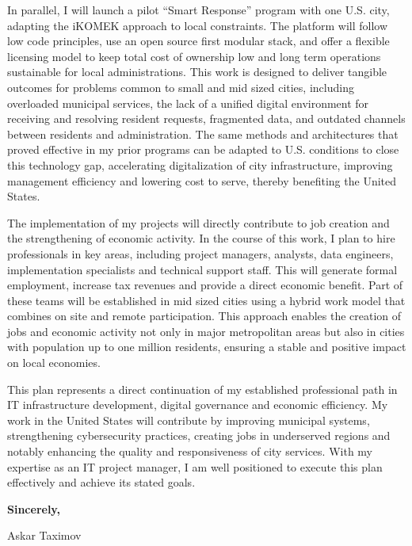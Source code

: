 In parallel, I will launch a pilot “Smart Response” program with one U.S. city, adapting the iKOMEK approach to local constraints. The platform will follow low code principles, use an open source first modular stack, and offer a flexible licensing model to keep total cost of ownership low and long term operations sustainable for local administrations. This work is designed to deliver tangible outcomes for problems common to small and mid sized cities, including overloaded municipal services, the lack of a unified digital environment for receiving and resolving resident requests, fragmented data, and outdated channels between residents and administration. The same methods and architectures that proved effective in my prior programs can be adapted to U.S. conditions to close this technology gap, accelerating digitalization of city infrastructure, improving management efficiency and lowering cost to serve, thereby benefiting the United States.

The implementation of my projects will directly contribute to job creation and the strengthening of economic activity. In the course of this work, I plan to hire professionals in key areas, including project managers, analysts, data engineers, implementation specialists and technical support staff. This will generate formal employment, increase tax revenues and provide a direct economic benefit. Part of these teams will be established in mid sized cities using a hybrid work model that combines on site and remote participation. This approach enables the creation of jobs and economic activity not only in major metropolitan areas but also in cities with population up to one million residents, ensuring a stable and positive impact on local economies.

This plan represents a direct continuation of my established professional path in IT infrastructure development, digital governance and economic efficiency. My work in the United States will contribute by improving municipal systems, strengthening cybersecurity practices, creating jobs in underserved regions and notably enhancing the quality and responsiveness of city services. With my expertise as an IT project manager, I am well positioned to execute this plan effectively and achieve its stated goals.

\begin{flushright}
\textbf{Sincerely,}\

Askar Taximov
\end{flushright}

\pagebreak
